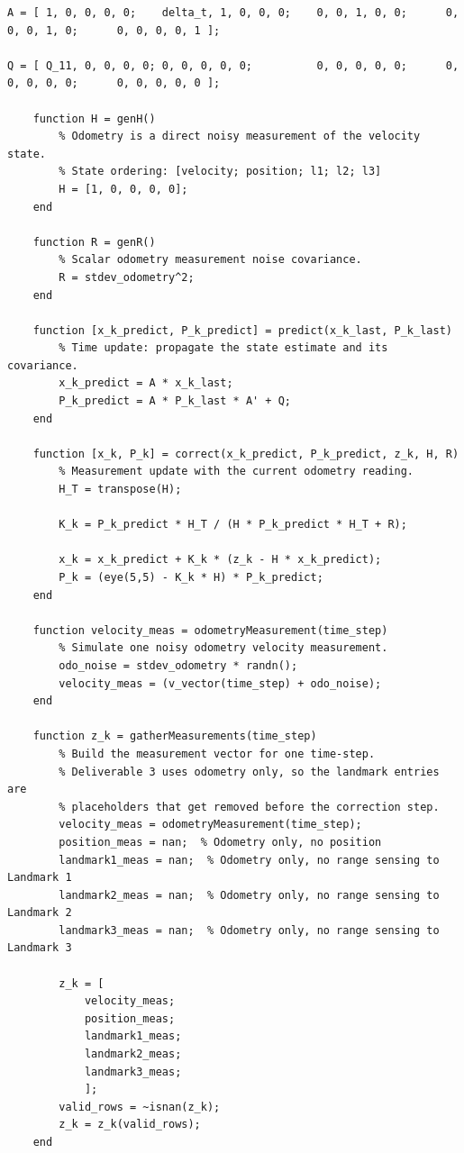 \documentclass[11pt]{article}
\begin{document}
\begin{lstlisting}[caption={sim3.m}, label={lst:sim3}]
A = [ 1, 0, 0, 0, 0;    delta_t, 1, 0, 0, 0;    0, 0, 1, 0, 0;      0, 0, 0, 1, 0;      0, 0, 0, 0, 1 ];

Q = [ Q_11, 0, 0, 0, 0; 0, 0, 0, 0, 0;          0, 0, 0, 0, 0;      0, 0, 0, 0, 0;      0, 0, 0, 0, 0 ];

    function H = genH()
        % Odometry is a direct noisy measurement of the velocity state.
        % State ordering: [velocity; position; l1; l2; l3]
        H = [1, 0, 0, 0, 0];
    end

    function R = genR()
        % Scalar odometry measurement noise covariance.
        R = stdev_odometry^2;
    end

    function [x_k_predict, P_k_predict] = predict(x_k_last, P_k_last)
        % Time update: propagate the state estimate and its covariance.
        x_k_predict = A * x_k_last;
        P_k_predict = A * P_k_last * A' + Q;
    end

    function [x_k, P_k] = correct(x_k_predict, P_k_predict, z_k, H, R)
        % Measurement update with the current odometry reading.
        H_T = transpose(H);

        K_k = P_k_predict * H_T / (H * P_k_predict * H_T + R);

        x_k = x_k_predict + K_k * (z_k - H * x_k_predict);
        P_k = (eye(5,5) - K_k * H) * P_k_predict;
    end

    function velocity_meas = odometryMeasurement(time_step)
        % Simulate one noisy odometry velocity measurement.
        odo_noise = stdev_odometry * randn();
        velocity_meas = (v_vector(time_step) + odo_noise);
    end

    function z_k = gatherMeasurements(time_step)
        % Build the measurement vector for one time-step.
        % Deliverable 3 uses odometry only, so the landmark entries are
        % placeholders that get removed before the correction step.
        velocity_meas = odometryMeasurement(time_step);
        position_meas = nan;  % Odometry only, no position
        landmark1_meas = nan;  % Odometry only, no range sensing to Landmark 1
        landmark2_meas = nan;  % Odometry only, no range sensing to Landmark 2
        landmark3_meas = nan;  % Odometry only, no range sensing to Landmark 3

        z_k = [
            velocity_meas;
            position_meas;
            landmark1_meas;
            landmark2_meas;
            landmark3_meas;
            ];
        valid_rows = ~isnan(z_k);
        z_k = z_k(valid_rows);
    end


\end{lstlisting}
\end{document}
